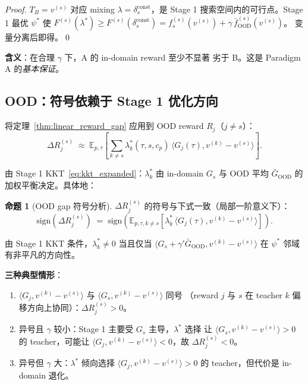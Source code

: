 \documentclass[11pt,a4paper]{article}
\newcommand{\E}{\mathbb{E}}
\newcommand{\OOD}{\mathrm{OOD}}
\newcommand{\const}{\mathrm{const}}
\theoremstyle{definition}
\newtheorem{proposition}{命题}
\begin{document}
\begin{proof}
$T_B = v^{(s)}$ 对应 mixing $\lambda = \delta_s^{\const}$，是 Stage 1
搜索空间内的可行点。Stage 1 最优 $\psi^*$ 使 $F^{(s)}(\lambda^*) \geq
F^{(s)}(\delta_s^{\const}) = f_s^{(s)}(v^{(s)}) + \gamma\,\bar f_{\OOD}^{(s)}(v^{(s)})$。
变量分离后即得。\qed
\end{proof}

\textbf{含义}：在合理 $\gamma$ 下，A 的 in-domain reward 至少不显著
劣于 B。这是 Paradigm A 的\emph{基本保证}。

\subsection{OOD：符号依赖于 Stage 1 优化方向}

将定理~\ref{thm:linear_reward_gap} 应用到 OOD reward $R_j$（$j \neq s$）：
\begin{equation}
\Delta R_j^{(s)} \;\approx\; \E_{p, \tau}\!\left[\sum_{k \neq s} \lambda_k^*(\tau, s, c_p)\,\langle G_j(\tau), v^{(k)} - v^{(s)}\rangle\right].
\label{eq:ood_gap}
\end{equation}

由 Stage 1 KKT~\eqref{eq:kkt_expanded}：$\lambda_k^*$ 由 in-domain
$G_s$ 与 OOD 平均 $\bar G_{\OOD}$ 的加权平衡决定。具体地：

\begin{proposition}[OOD gap 符号分析]
\label{prop:ood_sign}
$\Delta R_j^{(s)}$ 的符号与下式一致（局部一阶意义下）：
\begin{equation}
\mathrm{sign}(\Delta R_j^{(s)}) \;=\; \mathrm{sign}\!\left(\E_{p, \tau, k \neq s}\!\left[\lambda_k^*\,\langle G_j(\tau), v^{(k)} - v^{(s)}\rangle\right]\right).
\end{equation}

由 Stage 1 KKT 条件，$\lambda_k^* \neq 0$ 当且仅当 $\langle G_s + \gamma' \bar G_{\OOD}, v^{(k)} - v^{(s)}\rangle$ 在 $\psi^*$ 邻域有非平凡的方向性。

\textbf{三种典型情形}：
\begin{enumerate}[leftmargin=1.5em]
\item $\langle G_j, v^{(k)} - v^{(s)}\rangle$ 与
$\langle G_s, v^{(k)} - v^{(s)}\rangle$ 同号
（reward $j$ 与 $s$ 在 teacher $k$ 偏移方向上协同）：$\Delta R_j^{(s)} > 0$。
\item 异号且 $\gamma$ 较小：Stage 1 主要受 $G_s$ 主导，$\lambda^*$ 选择
让 $\langle G_s, v^{(k)} - v^{(s)}\rangle > 0$ 的 teacher，可能让
$\langle G_j, v^{(k)} - v^{(s)}\rangle < 0$，故 $\Delta R_j^{(s)} < 0$。
\item 异号但 $\gamma$ 大：$\lambda^*$ 倾向选择 $\langle G_j, v^{(k)} - v^{(s)}\rangle > 0$
的 teacher，但代价是 in-domain 退化。
\end{enumerate}
\end{proposition}
\end{document}
